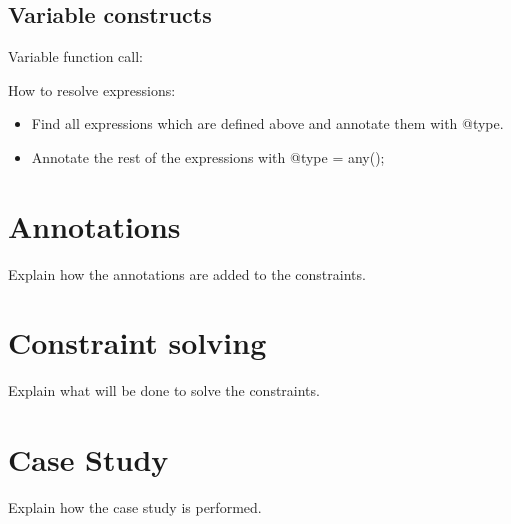 \documentclass[../main.tex]{subfiles}
\begin{document}
    \subsection{Variable constructs}
    Variable function call:
    \begin{prooftree}
    \end{prooftree}    
    
    \hrulefill
    
    How to resolve expressions:
    \begin{itemize}
        \item Find all expressions which are defined above and annotate them with @type.
        \item Annotate the rest of the expressions with @type = any();
    \end{itemize}

       
    
    \section{Annotations}
    Explain how the annotations are added to the constraints.
    \Blindtext
    
    \section{Constraint solving}
    Explain what will be done to solve the constraints.
    \\
    \Blindtext
    
    \section{Case Study}
    Explain how the case study is performed.
    \\
    \Blindtext
\end{document}
